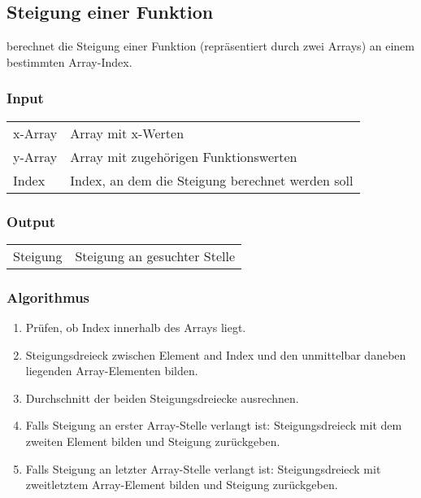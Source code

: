 %


\clearpage
\subsection{Steigung einer Funktion}
\label{app:algo:slope}

 berechnet die Steigung einer Funktion (repr\"asentiert durch
zwei Arrays) an einem bestimmten Array-Index.

\subsubsection*{Input}

\begin{tabular}{p{40mm}l}
    x-Array        & Array mit x-Werten \\
    y-Array        & Array mit zugeh\"origen Funktionswerten \\
    Index          & Index, an dem die Steigung berechnet werden soll
\end{tabular}

\subsubsection*{Output}
\begin{tabular}{p{40mm}l}
    Steigung   & Steigung an gesuchter Stelle
\end{tabular}

\subsubsection*{Algorithmus}
\begin{enumerate}
    \item
        Pr\"ufen, ob Index innerhalb des Arrays liegt.
    \item
        Steigungsdreieck  zwischen  Element  and  Index  und  den  unmittelbar
        daneben liegenden Array-Elementen bilden.
    \item
        Durchschnitt der beiden Steigungsdreiecke ausrechnen.
    \item
        Falls Steigung an erster Array-Stelle verlangt ist: Steigungsdreieck
        mit dem zweiten Element bilden und Steigung zur\"uckgeben.
    \item
        Falls Steigung an letzter Array-Stelle verlangt ist: Steigungsdreieck
        mit zweitletztem Array-Element bilden und Steigung zur\"uckgeben.
\end{enumerate}

